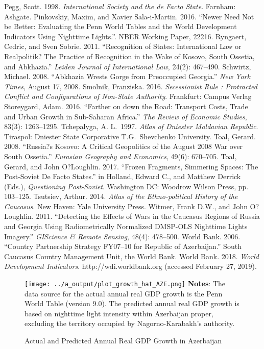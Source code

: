 \documentclass[12pt,a4paper]{article}%
\begin{document}
\begin{thebibliography}{99}
\bibitem{} Pegg, Scott. 1998. \textit{International Society and the de Facto State}. Farnham: Ashgate.
\bibitem{} Pinkovskiy, Maxim, and Xavier Sala-i-Martin. 2016. ``Newer Need Not be Better: Evaluating the Penn World Tables and the World Development Indicators Using Nighttime Lights.''. NBER Working Paper, 22216.
\bibitem{} Ryngaert, Cedric, and Sven Sobrie. 2011. ``Recognition of States: International Law or Realpolitik? The Practice of Recognition in the Wake of Kosovo, South Ossetia, and Abkhazia.'' \textit{Leiden Journal of International Law}, 24(2): 467--490.
\bibitem{} Schwirtz, Michael. 2008. ``Abkhazia Wrests Gorge from Preoccupied Georgia.'' \textit{New York Times}, August 17, 2008.
\bibitem{} Smolnik, Franziska. 2016. \textit{Secessionist Rule : Protracted Conflict and Configurations of Non-State Authority}. Frankfurt: Campus Verlag
\bibitem{} Storeygard, Adam. 2016. ``Farther on down the Road: Transport Costs, Trade and Urban Growth in Sub-Saharan Africa.'' \textit{The Review of Economic Studies}, 83(3): 1263--1295.
\bibitem{} Tchepalyga, A. L.\ 1997. \textit{Atlas of Dniester Moldavian Republic}. Tiraspol: Dniester State Corporative T.G.\ Shevchenko University.
\bibitem{} Toal, Gerard. 2008. ``Russia?s Kosovo: A Critical Geopolitics of the August 2008 War over South Ossetia.'' \textit{Eurasian Geography and Economics}, 49(6): 670--705.
\bibitem{} Toal, Gerard, and John O?Loughlin. 2017. ``Frozen Fragments, Simmering Spaces: The Post-Soviet De Facto States.'' in Holland, Edward C., and Matthew Derrick (Eds.), \textit{Questioning Post-Soviet}. Washington DC: Woodrow Wilson Press, pp. 103--125.
\bibitem{} Tsutsiev, Arthur. 2014. \textit{Atlas of the Ethno-political History of the Caucasus}. New Haven: Yale University Press.
\bibitem{} Witmer, Frank D.W., and John O?Loughlin. 2011. ``Detecting the Effects of Wars in the Caucasus Regions of Russia and Georgia Using Radiometrically Normalized DMSP-OLS Nighttime Lights Imagery.'' \textit{GIScience \& Remote Sensing}, 48(4): 478--500.
\bibitem{} World Bank. 2006. ``Country Partnership Strategy FY07--10 for Republic of Azerbaijan.'' South Caucasus Country Management Unit, the World Bank.
\bibitem{} World Bank. 2018. \textit{World Development Indicators}. http://wdi.worldbank.org (accessed February 27, 2019).
\end{thebibliography}

\begin{figure}[ptb]
\caption{Actual and Predicted Annual Real GDP Growth in Azerbaijan}
\texttt{[image: ../a\_output/plot\_growth\_hat\_AZE.png]}
\label{aze}%
{\scriptsize \textbf{Notes}: 
	The data source for the actual annual real GDP growth is the Penn World Table (version 9.0). 
	The predicted annual real GDP growth is based on nighttime light intensity within Azerbaijan proper, excluding the territory occupied by Nagorno-Karabakh's authority. 
}
\end{figure}
\end{document}
